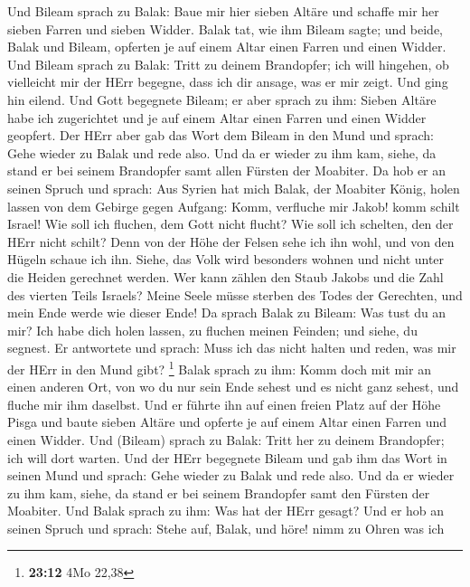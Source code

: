  Und Bileam sprach zu Balak: Baue mir hier sieben Altäre
und schaffe mir her sieben Farren und sieben Widder. 
Balak tat, wie ihm Bileam sagte; und beide, Balak und Bileam, opferten
je auf einem Altar einen Farren und einen Widder.  Und
Bileam sprach zu Balak: Tritt zu deinem Brandopfer; ich will hingehen,
ob vielleicht mir der HErr begegne, dass ich dir ansage, was er mir
zeigt. Und ging hin eilend.  Und Gott begegnete Bileam; er
aber sprach zu ihm: Sieben Altäre habe ich zugerichtet und je auf einem
Altar einen Farren und einen Widder geopfert.  Der HErr
aber gab das Wort dem Bileam in den Mund und sprach: Gehe wieder zu
Balak und rede also.  Und da er wieder zu ihm kam, siehe,
da stand er bei seinem Brandopfer samt allen Fürsten der Moabiter.
 Da hob er an seinen Spruch und sprach: Aus Syrien hat
mich Balak, der Moabiter König, holen lassen von dem Gebirge gegen
Aufgang: Komm, verfluche mir Jakob! komm schilt Israel! 
Wie soll ich fluchen, dem Gott nicht flucht? Wie soll ich schelten, den
der HErr nicht schilt?  Denn von der Höhe der Felsen sehe
ich ihn wohl, und von den Hügeln schaue ich ihn. Siehe, das Volk wird
besonders wohnen und nicht unter die Heiden gerechnet werden.
 Wer kann zählen den Staub Jakobs und die Zahl des
vierten Teils Israels? Meine Seele müsse sterben des Todes der
Gerechten, und mein Ende werde wie dieser Ende!  Da
sprach Balak zu Bileam: Was tust du an mir? Ich habe dich holen lassen,
zu fluchen meinen Feinden; und siehe, du segnest.  Er
antwortete und sprach: Muss ich das nicht halten und reden, was mir der
HErr in den Mund gibt? \footnote{\textbf{23:12} 4Mo 22,38}
 Balak sprach zu ihm: Komm doch mit mir an einen anderen
Ort, von wo du nur sein Ende sehest und es nicht ganz sehest, und fluche
mir ihm daselbst.  Und er führte ihn auf einen freien
Platz auf der Höhe Pisga und baute sieben Altäre und opferte je auf
einem Altar einen Farren und einen Widder.  Und (Bileam)
sprach zu Balak: Tritt her zu deinem Brandopfer; ich will dort warten.
 Und der HErr begegnete Bileam und gab ihm das Wort in
seinen Mund und sprach: Gehe wieder zu Balak und rede also.
 Und da er wieder zu ihm kam, siehe, da stand er bei
seinem Brandopfer samt den Fürsten der Moabiter. Und Balak sprach zu
ihm: Was hat der HErr gesagt?  Und er hob an seinen
Spruch und sprach: Stehe auf, Balak, und höre! nimm zu Ohren was ich

